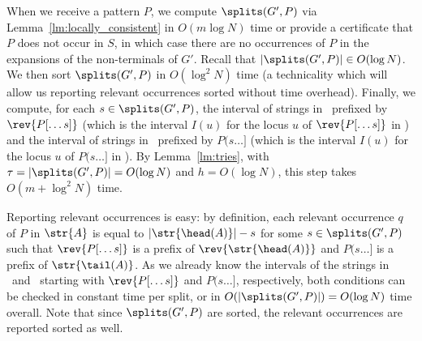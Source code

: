 When we receive a pattern $P$, we compute $\splits(G',P)$ via Lemma~\ref{lm:locally_consistent} in $O(m \log N)$ time or provide a certificate that $P$ does not occur in $S$, in which case there are no occurrences of $P$ in the expansions of the non-terminals of $G'$. Recall that $|\splits(G',P)| \in O(\log N)$. We then sort $\splits(G',P)$ in $O(\log^2 N)$ time (a technicality which will allow us reporting relevant occurrences sorted without time overhead). Finally, we compute, for each $s \in \splits(G', P)$, the interval of strings in \Tpre\ prefixed by $\rev{P[\dots s]}$ (which is the interval $I(u)$ for the locus $u$ of $\rev{P[\dots s]}$ in \Tpre) and the interval of strings in \Tsuf\ prefixed by $P(s \dots ]$ (which is the interval $I(u)$ for the locus $u$ of $P(s \dots]$ in \Tsuf). By Lemma~\ref{lm:tries}, with $\tau=|\splits(G',P)|=O(\log N)$ and $h=O(\log N)$, this step takes $O(m+\log^2 N)$ time.

Reporting relevant occurrences is easy: by definition, each relevant occurrence $q$ of $P$ in $\str{A}$ is equal to $|\str{\head(A)}|-s$ for some  $s \in \splits(G',P)$ such that $\rev{P[\dots s]}$ is a prefix of $\rev{\str{\head(A)}}$ and $P(s\dots]$ is a prefix of $\str{\tail(A)}$. As we already know the intervals of the strings in \Tsuf\ and \Tpre\ starting with $\rev{P[\dots s]}$ and $P(s\dots]$, respectively, both conditions can be checked in constant time per split, or in $O(|\splits(G',P)|) = O(\log N)$ time overall. Note that since $\splits(G',P)$ are sorted, the relevant occurrences are reported sorted as well. 

